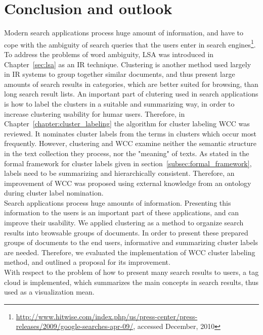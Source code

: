 \chapter{Conclusion and outlook}
\label{sec:conclusion}
Modern search applications process huge amount of information, and have to cope with the ambiguity of search queries that the users enter in search engines\footnote{\url{http://www.hitwise.com/index.php/us/press-center/press-releases/2009/google-searches-apr-09/}, accessed December, 2010}. To address the problems of word ambiguity, \gls{LSA} was introduced in Chapter~\ref{sec:lsa} as an \gls{IR} technique. Clustering is another method used largely in \gls{IR} systems to group together similar documents, and thus present large amounts of search results in categories, which are better suited for browsing, than long search result lists. An important part of clutering used in search applications is how to label the clusters in a suitable and summarizing way, in order to increase clustering usability for humar users. Therefore, in Chapter~\ref{chapter:cluster_labeling} the algorithm for cluster labeling \gls{WCC} was reviewed. It nominates cluster labels from the terms in clusters which occur most frequently. However, clustering and \gls{WCC} examine neither the semantic structure in the text collection they process, nor the "meaning" of texts. As stated in the formal framework for cluster labels given in section~\ref{subsec:formal_framework}, labels need to be summarizing and hierarchically consistent. Therefore, an improvement of \gls{WCC} was proposed using external knowledge from an ontology during cluster label nomination.   \\

Search applications process huge amounts of information. Presenting this information to the users is an important part of these applications, and can improve their usability. We applied clustering as a method to organize search results into browsable groups of documents. In order to present these prepared groups of documents to the end users, informative and summarizing cluster labels are needed. Therefore, we evaluated the implementation of \gls{WCC} cluster labeling method, and outlined a proposal for its improvement. \\

With respect to the problem of how to present many search results to users, a tag cloud is implemented, which summarizes the main concepts in search results, thus used as a visualization mean. \\

